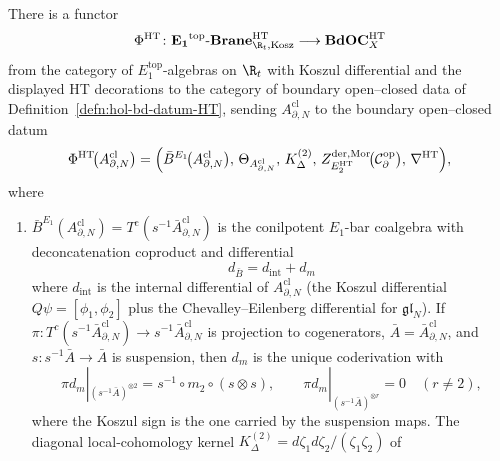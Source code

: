 \begin{thm}
There is a functor
\begin{equation}\label{eq:phi-ht-functor}
  \Phi^{\mathrm{HT}}\colon
  \mathbf{E_1}^{\mathrm{top}}\text{-}\mathbf{Brane}^{\mathrm{HT}}_{\R_t,\mathrm{Kosz}}
    \longrightarrow
  \mathbf{BdOC}^{\mathrm{HT}}_{X}
\end{equation}
from the category of \(E_1^{\mathrm{top}}\)-algebras on \(\R_t\) with
Koszul differential and the displayed HT decorations to the category of
boundary open--closed data of Definition~\ref{defn:hol-bd-datum-HT},
sending \(A^{\mathrm{cl}}_{\partial,N}\) to the boundary open--closed
datum
\begin{equation}\label{eq:phi-ht-explicit}
  \Phi^{\mathrm{HT}}\!\bigl(A^{\mathrm{cl}}_{\partial,N}\bigr)
  =\Bigl(\bar B^{E_1}\!\bigl(A^{\mathrm{cl}}_{\partial,N}\bigr),\,
        \Theta_{A^{\mathrm{cl}}_{\partial,N}},\,
        K^{(2)}_\Delta,\,
        Z^{\mathrm{der},\mathrm{Mor}}_{E_2^{\mathrm{HT}}}\!\bigl(
          \mathcal C^{\mathrm{op}}_\partial\bigr),\,
        \nabla^{\mathrm{HT}}\Bigr),
\end{equation}
where
\begin{enumerate}[label=\textup{(\roman*)}]
  \item \(\bar B^{E_1}(A^{\mathrm{cl}}_{\partial,N})
        =T^{\mathrm{c}}(s^{-1}\bar A^{\mathrm{cl}}_{\partial,N})\) is
        the conilpotent \(E_1\)-bar coalgebra with deconcatenation
        coproduct and differential
\begin{equation}\label{eq:bar-differential-explicit}
          d_{\bar B}=d_{\mathrm{int}}+d_m
\end{equation}
	        where \(d_{\mathrm{int}}\) is the internal differential of
	        \(A^{\mathrm{cl}}_{\partial,N}\) (the Koszul differential
	        \(Q\psi=[\phi_1,\phi_2]\) plus the Chevalley--Eilenberg
	        differential for \(\mathfrak{gl}_N\)).  If
	        \(\pi:T^c(s^{-1}\bar A^{\mathrm{cl}}_{\partial,N})
	        \to s^{-1}\bar A^{\mathrm{cl}}_{\partial,N}\) is projection to
	        cogenerators, \(\bar A=\bar A^{\mathrm{cl}}_{\partial,N}\),
	        and \(s:s^{-1}\bar A\to\bar A\) is suspension,
	        then \(d_m\) is the unique coderivation with
	        \[
	          \pi d_m|_{(s^{-1}\bar A)^{\otimes2}}
	            =
	          s^{-1}\circ m_2\circ(s\otimes s),
	          \qquad
	          \pi d_m|_{(s^{-1}\bar A)^{\otimes r}}=0
	          \quad(r\ne2),
	        \]
	        where the Koszul sign is the one carried by the suspension
	        maps.  The diagonal
	        local-cohomology kernel
	        \(K^{(2)}_\Delta=d\zeta_1d\zeta_2/(\zeta_1\zeta_2)\) of

\end{enumerate}
\end{thm}
